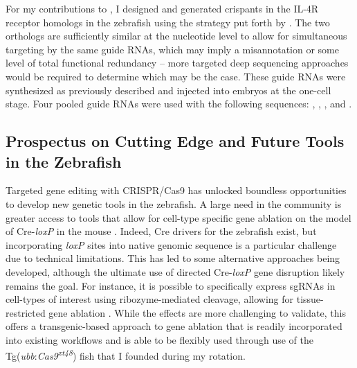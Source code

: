 For my contributions to \citet{Cronan2021}, I designed and generated crispants in the IL\hyp{}4R receptor homologs in the zebrafish using the strategy put forth by \citet{Wu2018}. The two orthologs are sufficiently similar at the nucleotide level to allow for simultaneous targeting by the same guide RNAs, which may imply a misannotation or some level of total functional redundancy -- more targeted deep sequencing approaches would be required to determine which may be the case. These guide RNAs were synthesized as previously described and injected into embryos at the one\hyp{}cell stage. Four pooled guide RNAs were used with the following sequences: , , , and .

\subsection{Prospectus on Cutting Edge and Future Tools in the Zebrafish}\label{newtech}

Targeted gene editing with CRISPR/Cas9 has unlocked boundless opportunities to develop new genetic tools in the zebrafish. A large need in the community is greater access to tools that allow for cell\hyp{}type specific gene ablation on the model of Cre\hyp{}\textit{loxP} in the mouse \citep{Housden2017}. Indeed, Cre drivers for the zebrafish exist, but incorporating \textit{loxP} sites into native genomic sequence is a particular challenge due to technical limitations. This has led to some alternative approaches being developed, although the ultimate use of directed Cre\hyp{}\textit{loxP} gene disruption likely remains the goal. For instance, it is possible to specifically express sgRNAs in cell\hyp{}types of interest using ribozyme\hyp{}mediated cleavage, allowing for tissue\hyp{}restricted gene ablation \citep{Yin2015, Wang2021}. While the effects are more challenging to validate, this offers a transgenic\hyp{}based approach to gene ablation that is readily incorporated into existing workflows and is able to be flexibly used through use of the Tg(\textit{ubb}:\textit{Cas9\textsuperscript{xt48}}) fish that I founded during my rotation. 

